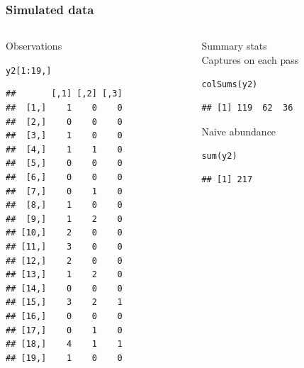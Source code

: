 \documentclass[color=usenames,dvipsnames]{beamer}\usepackage[]{graphicx}\usepackage[]{xcolor}
\makeatletter
\newcommand{\hlnum}[1]{\textcolor[rgb]{0.69,0.494,0}{#1}}%
\newcommand{\hlopt}[1]{\textcolor[rgb]{0,0,0}{#1}}%
\newcommand{\hlstd}[1]{\textcolor[rgb]{0,0,0}{#1}}%
\newcommand{\hlkwd}[1]{\textcolor[rgb]{0.004,0.004,0.506}{#1}}%
\newenvironment{kframe}{%
 \def\at@end@of@kframe{}%
 \ifinner\ifhmode%
  \def\at@end@of@kframe{\end{minipage}}%
  \begin{minipage}{\columnwidth}%
 \fi\fi%
 \def\FrameCommand##1{\hskip\@totalleftmargin \hskip-\fboxsep
 \colorbox{shadecolor}{##1}\hskip-\fboxsep
     \hskip-\linewidth \hskip-\@totalleftmargin \hskip\columnwidth}%
 \MakeFramed {\advance\hsize-\width
   \@totalleftmargin\z@ \linewidth\hsize
   \@setminipage}}%
 {\par\unskip\endMakeFramed%
 \at@end@of@kframe}
\newenvironment{knitrout}{}{} %
\makeatother
\begin{document}
\begin{frame}[fragile]
  \frametitle{Simulated data}
  \begin{columns}
    \begin{column}{0.4\textwidth}
      \small
      Observations
  \vspace{-6pt}
\begin{knitrout}\scriptsize
{}\color{fgcolor}\begin{kframe}
\begin{alltt}
\hlstd{y2[}\hlnum{1}\hlopt{:}\hlnum{19}\hlstd{,]}
\end{alltt}
\begin{verbatim}
##       [,1] [,2] [,3]
##  [1,]    1    0    0
##  [2,]    0    0    0
##  [3,]    1    0    0
##  [4,]    1    1    0
##  [5,]    0    0    0
##  [6,]    0    0    0
##  [7,]    0    1    0
##  [8,]    1    0    0
##  [9,]    1    2    0
## [10,]    2    0    0
## [11,]    3    0    0
## [12,]    2    0    0
## [13,]    1    2    0
## [14,]    0    0    0
## [15,]    3    2    1
## [16,]    0    0    0
## [17,]    0    1    0
## [18,]    4    1    1
## [19,]    1    0    0
\end{verbatim}
\end{kframe}
\end{knitrout}
  \end{column}
  \begin{column}{0.6\textwidth}
    {\centering Summary stats \\}
    \vspace{24pt}
    \small
  \pause
  \vfill
  \small
  Captures on each pass
  \vspace{-6pt}
\begin{knitrout}\scriptsize
{}\color{fgcolor}\begin{kframe}
\begin{alltt}
\hlkwd{colSums}\hlstd{(y2)}
\end{alltt}
\begin{verbatim}
## [1] 119  62  36
\end{verbatim}
\end{kframe}
\end{knitrout}
  \pause
  \vfill
  Naive abundance
  \vspace{-6pt}
\begin{knitrout}\scriptsize
{}\color{fgcolor}\begin{kframe}
\begin{alltt}
\hlkwd{sum}\hlstd{(y2)}
\end{alltt}
\begin{verbatim}
## [1] 217
\end{verbatim}
\end{kframe}
\end{knitrout}

  \end{column}
  \end{columns}
\end{frame}
\end{document}
